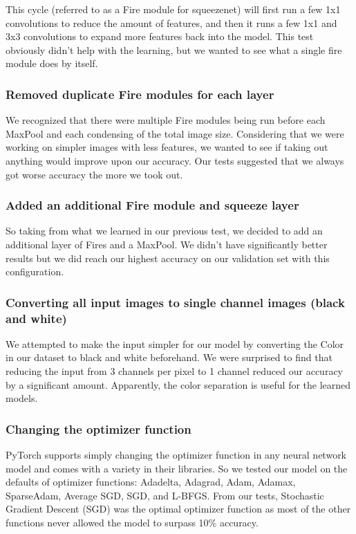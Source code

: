 \documentclass{article}
\begin{document}
This cycle (referred to as a Fire module for squeezenet) will first run a few 1x1 convolutions to reduce 
the amount of features, and then it runs a few 1x1 and 3x3 convolutions to expand more features back into 
the model. This test obviously didn’t help with the learning, but we wanted to see what a single fire 
module does by itself.

\subsubsection{Removed duplicate Fire modules for each layer}

We recognized that there were multiple Fire modules being run before each MaxPool and each condensing 
of the total image size. Considering that we were working on simpler images with less features, we wanted 
to see if taking out anything would improve upon our accuracy. Our tests suggested that we always got 
worse accuracy the more we took out.

\subsubsection{Added an additional Fire module and squeeze layer}

So taking from what we learned in our previous test, we decided to add an additional layer of Fires 
and a MaxPool. We didn’t have significantly better results but we did reach our highest accuracy on our 
validation set with this configuration.

\subsubsection{Converting all input images to single channel images (black and white)}

We attempted to make the input simpler for our model by converting the Color in our dataset to black 
and white beforehand. We were surprised to find that reducing the input from 3 channels per pixel to 
1 channel reduced our accuracy by a significant amount. Apparently, the color separation is useful 
for the learned models.


\subsubsection{Changing the optimizer function}

PyTorch supports simply changing the optimizer function in any neural network model and comes with a 
variety in their libraries. So we tested our model on the defaults of optimizer functions: Adadelta, 
Adagrad, Adam, Adamax, SparseAdam, Average SGD, SGD, and L-BFGS. From our tests, Stochastic Gradient 
Descent (SGD) was the optimal optimizer function as most of the other functions never allowed the 
model to surpass 10\% accuracy.
\end{document}
